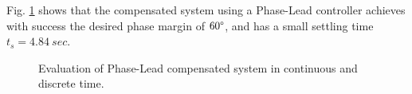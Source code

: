 \documentclass[11pt, a4paper]{article}
\begin{document}
Fig. \ref{fig:Q1_lead} shows that the compensated system using a Phase-Lead controller achieves with success the desired phase margin of $60\degree$, and has a small settling time $t_s=4.84~sec$.

\begin{figure}[H]
	\centering
	\caption{Evaluation of Phase-Lead compensated system in continuous and discrete time.}
	\label{fig:Q1_lead}
\end{figure}
\end{document}
